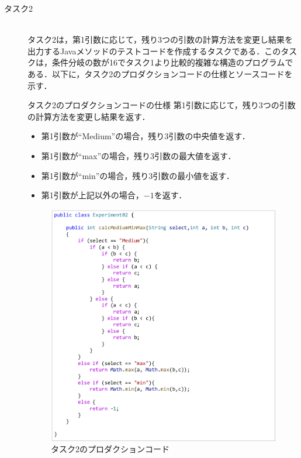 \documentclass[12pt]{jarticle} %
\begin{document}
\begin{description}
\item[タスク2]~\\
タスク2は，第1引数に応じて，残り3つの引数の計算方法を変更し結果を出力するJavaメソッドのテストコードを作成するタスクである．このタスクは，条件分岐の数が16でタスク1より比較的複雑な構造のプログラムである．以下に，タスク2のプロダクションコードの仕様とソースコードを示す．

\begin{itembox}[l]{タスク2のプロダクションコードの仕様}
第1引数に応じて，残り3つの引数の計算方法を変更し結果を返す．
\begin{itemize}
\item 第1引数が``Medium''の場合，残り3引数の中央値を返す．
\item 第1引数が``max''の場合，残り3引数の最大値を返す．
\item 第1引数が``min''の場合，残り3引数の最小値を返す．
\item 第1引数が上記以外の場合，$-1$を返す．
\end{itemize}
\end{itembox}

\begin{figure}[htbp]
  \begin{center}
    \includegraphics[clip,width=13cm]{E2.pdf}
    \caption{タスク2のプロダクションコード}
    \label{E2}
  \end{center}
\end{figure}



\end{description}
\end{document}
